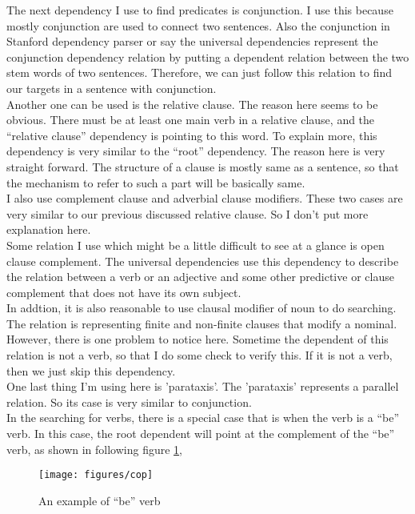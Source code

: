 \documentclass[letterpaper]{article}
\begin{document}
The next dependency I use to find predicates is conjunction. I use this because mostly conjunction are used to connect two sentences. Also the conjunction in Stanford dependency parser or say the universal dependencies represent the conjunction dependency relation by putting a dependent relation between the two stem words of two sentences. Therefore, we can just follow this relation to find our targets in a sentence with conjunction.\\

Another one can be used is the relative clause. The reason here seems to be obvious. There must be at least one main verb in a relative clause, and the ``relative clause'' dependency is pointing to this word. To explain more, this dependency is very similar to the ``root'' dependency. The reason here is very straight forward. The structure of a clause is mostly same as a sentence, so that the mechanism to refer to such a part will be basically same.\\

I also use complement clause and adverbial clause modifiers. These two cases are very similar to our previous discussed relative clause. So I don't put more explanation here.\\

Some relation I use which might be a little difficult to see at a glance is open clause complement. The universal dependencies use this dependency to describe the relation between a verb or an adjective and some other predictive or clause complement that does not have its own subject. \\

In addtion, it is also reasonable to use clausal modifier of noun to do searching. The relation is representing finite and non-finite clauses that modify a nominal. However, there is one problem to notice here. Sometime the dependent of this relation is not a verb, so that I do some check to verify this. If it is not a verb, then we just skip this dependency.\\

One last thing I'm using here is 'parataxis'. The 'parataxis' represents a parallel relation. So its case is very similar to conjunction.\\

In the searching for verbs, there is a special case that is when the verb is a ``be'' verb. In this case, the root dependent will point at the complement of the ``be'' verb, as shown in following figure \ref{fig:cop},
\begin{figure}[H]
\centering
\texttt{[image: figures/cop]}
\caption{An example of ``be'' verb}
\label{fig:cop}
\end{figure}
\end{document}
